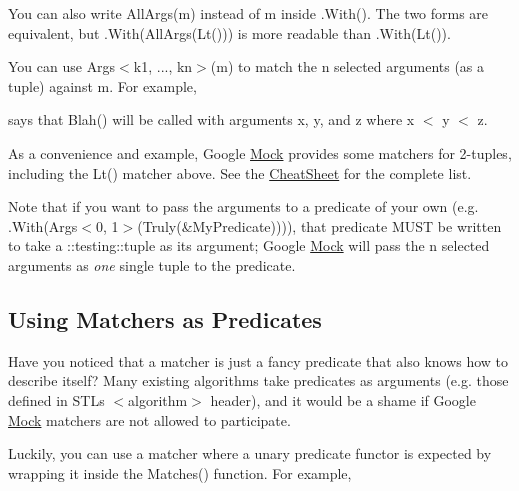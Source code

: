 You can also write {\ttfamily All\+Args(m)} instead of {\ttfamily m} inside {\ttfamily .With()}. The two forms are equivalent, but {\ttfamily .With(All\+Args(\+Lt()))} is more readable than {\ttfamily .With(\+Lt())}.

You can use {\ttfamily Args$<$k1, ..., kn$>$(m)} to match the {\ttfamily n} selected arguments (as a tuple) against {\ttfamily m}. For example,


\begin{DoxyCode}{0}
\end{DoxyCode}


says that {\ttfamily Blah()} will be called with arguments {\ttfamily x}, {\ttfamily y}, and {\ttfamily z} where {\ttfamily x $<$ y $<$ z}.

As a convenience and example, Google \mbox{\hyperlink{classMock}{Mock}} provides some matchers for 2-\/tuples, including the {\ttfamily Lt()} matcher above. See the \mbox{\hyperlink{CheatSheet_8md}{Cheat\+Sheet}} for the complete list.

Note that if you want to pass the arguments to a predicate of your own (e.\+g. {\ttfamily .With(Args$<$0, 1$>$(Truly(\&\+My\+Predicate)))}), that predicate M\+U\+ST be written to take a {\ttfamily \+::testing\+::tuple} as its argument; Google \mbox{\hyperlink{classMock}{Mock}} will pass the {\ttfamily n} selected arguments as {\itshape one} single tuple to the predicate.

\subsection*{Using Matchers as Predicates}

Have you noticed that a matcher is just a fancy predicate that also knows how to describe itself? Many existing algorithms take predicates as arguments (e.\+g. those defined in S\+TL\textquotesingle{}s {\ttfamily $<$algorithm$>$} header), and it would be a shame if Google \mbox{\hyperlink{classMock}{Mock}} matchers are not allowed to participate.

Luckily, you can use a matcher where a unary predicate functor is expected by wrapping it inside the {\ttfamily Matches()} function. For example,


\begin{DoxyCode}{0}
\DoxyCodeLine{}
\end{DoxyCode}


